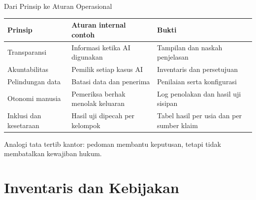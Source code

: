 \documentclass[aspectratio=169, table, 12pt]{beamer}
\begin{document}
\begin{frame}{{\Large Dari Prinsip ke Aturan Operasional}}
  \vspace{4pt}
  \footnotesize
  \begin{tabularx}{\textwidth}{|>{\raggedright\arraybackslash}X|>{\raggedright\arraybackslash}X|>{\raggedright\arraybackslash}X|}
    \hline
    \textbf{Prinsip} & \textbf{Aturan internal contoh} & \textbf{Bukti} \\ \hline
    Transparansi & Informasi ketika AI digunakan & Tampilan dan naskah penjelasan \\ \hline
    Akuntabilitas & Pemilik setiap kasus AI & Inventaris dan persetujuan \\ \hline
    Pelindungan data & Batasi data dan penerima & Penilaian serta konfigurasi \\ \hline
    Otonomi manusia & Pemeriksa berhak menolak keluaran & Log penolakan dan hasil uji sisipan \\
    \hline
    Inklusi dan kesetaraan & Hasil uji dipecah per kelompok & Tabel hasil per usia dan per sumber
    klaim \\ \hline
  \end{tabularx}

  \vspace{6pt}
  \small Analogi tata tertib kantor: pedoman membantu keputusan, tetapi tidak membatalkan kewajiban
  hukum.
\end{frame}

\section{Inventaris dan Kebijakan}
\end{document}
